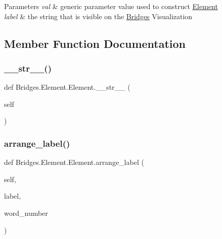\begin{DoxyParams}{Parameters}
{\em val} & generic parameter value used to construct \mbox{\hyperlink{class_bridges_1_1_element_1_1_element}{Element}} \\
\hline
{\em label} & the string that is visible on the \mbox{\hyperlink{namespace_bridges_1_1_bridges}{Bridges}} Visualization \\
\hline
\end{DoxyParams}


\subsection{Member Function Documentation}
\mbox{\label{class_bridges_1_1_element_1_1_element_a674e4f757d4874b462ce1536328ddf38}} 
\subsubsection{\texorpdfstring{\+\_\+\+\_\+str\+\_\+\+\_\+()}{\_\_str\_\_()}}
{\footnotesize\ttfamily def Bridges.\+Element.\+Element.\+\_\+\+\_\+str\+\_\+\+\_\+ (\begin{DoxyParamCaption}\item[{}]{self }\end{DoxyParamCaption})}

\mbox{\label{class_bridges_1_1_element_1_1_element_a081734e11984d316f229254557a6795e}} 
\subsubsection{\texorpdfstring{arrange\+\_\+label()}{arrange\_label()}}
{\footnotesize\ttfamily def Bridges.\+Element.\+Element.\+arrange\+\_\+label (\begin{DoxyParamCaption}\item[{}]{self,  }\item[{}]{label,  }\item[{}]{word\+\_\+number }\end{DoxyParamCaption})}



